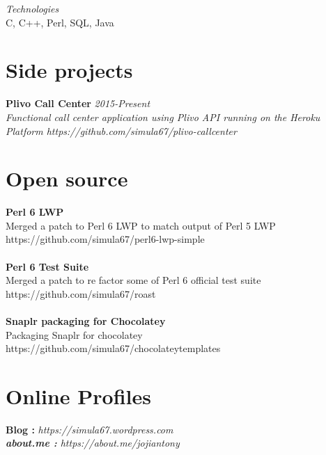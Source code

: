 \documentclass[line,margin]{res}
\begin{document}
\begin{resume}
{\it{Technologies}}\\
C, C++, Perl, SQL, Java

\section{Side projects}
{\bf Plivo Call Center} \hfill \it{2015-Present}\\
Functional call center application using Plivo API running on the Heroku Platform
https://github.com/simula67/plivo-callcenter\\


\section{Open source}
{\bf Perl 6 LWP}\\
Merged a patch to Perl 6 LWP to match output of Perl 5 LWP\\
https://github.com/simula67/perl6-lwp-simple\\ \\
{\bf Perl 6 Test Suite}\\
Merged a patch to re factor some of Perl 6 official test suite\\
https://github.com/simula67/roast\\ \\
{\bf Snaplr packaging for Chocolatey}\\
Packaging Snaplr for chocolatey\\
https://github.com/simula67/chocolateytemplates\\

\section{Online Profiles}
{\bf Blog :} \it{https://simula67.wordpress.com} \\
{\bf about.me :} \it{https://about.me/jojiantony} \\


\end{resume}
\end{document}
